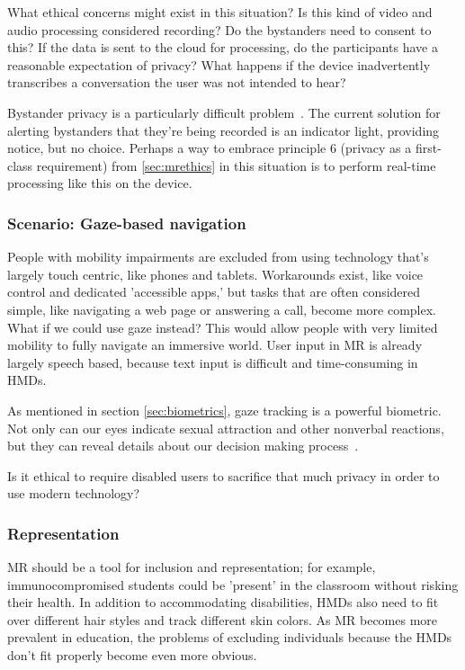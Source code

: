 What ethical concerns might exist in this situation? Is this kind of video and audio processing considered recording? Do the bystanders need to consent to this? If the data is sent to the cloud for processing, do the participants have a reasonable expectation of privacy? What happens if the device inadvertently transcribes a conversation the user was not intended to hear?

Bystander privacy is a particularly difficult problem~\cite{perez}. The current solution for alerting bystanders that they're being recorded is an indicator light, providing notice, but no choice. Perhaps a way to embrace principle 6 (privacy as a first-class requirement) from \autoref{sec:mrethics} in this situation is to perform real-time processing like this on the device.

\subsubsection{Scenario: Gaze-based navigation}

People with mobility impairments are excluded from using technology that's largely touch centric, like phones and tablets. Workarounds exist, like voice control and dedicated 'accessible apps,' but tasks that are often considered simple, like navigating a web page or answering a call, become more complex. What if we could use gaze instead? This would allow people with very limited mobility to fully navigate an immersive world. User input in MR is already largely speech based, because text input is difficult and time-consuming in HMDs.

As mentioned in section \ref{sec:biometrics}, gaze tracking is a powerful biometric. Not only can our eyes indicate sexual attraction and other nonverbal reactions, but they can reveal details about our decision making process~\cite{costandi}.

Is it ethical to require disabled users to sacrifice that much privacy in order to use modern technology?


\subsubsection{Representation}

MR should be a tool for inclusion and representation; for example, immunocompromised students could be 'present' in the classroom without risking their health.  In addition to accommodating disabilities, HMDs also need to fit over different hair styles and track different skin colors. As MR becomes more prevalent in education, the problems of excluding individuals because the HMDs don't fit properly become even more obvious.

